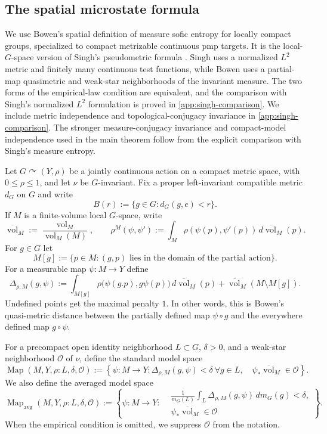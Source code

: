 \documentclass[12pt]{amsart}
\theoremstyle{definition}
\newcommand{\Haar}{m_G}
\newcommand{\vol}{\operatorname{vol}}
\newcommand{\Map}{\operatorname{Map}}
\newcommand{\Mapavg}{\operatorname{Map}_{\mathrm{avg}}}
\newcommand{\cO}{\mathcal O}
\newcommand{\1}{\mathbf 1}
\begin{document}
\subsection{The spatial microstate formula}

 We use Bowen's spatial definition of measure sofic entropy for locally compact
 groups, specialized to compact metrizable continuous pmp targets. It is the
 local-$G$-space version of Singh's pseudometric formula
 \cite[Section~3.4]{SinghThesis}. Singh uses a normalized $L^2$ metric and
 finitely many continuous test functions, while Bowen uses a partial-map
 quasimetric and weak-star neighborhoods of the invariant measure. The two
 forms of the empirical-law condition are equivalent, and the comparison with
 Singh's normalized $L^2$ formulation is proved in
 \cref{app:singh-comparison}.
	We include metric independence and topological-conjugacy invariance in
\cref{app:singh-comparison}. The stronger measure-conjugacy invariance and
compact-model independence used in the main theorem follow from the explicit
comparison with Singh's measure entropy.

Let $G\curvearrowright(Y,\rho)$ be a jointly continuous action on a compact metric space, with $0\leq\rho\leq1$, and let $\nu$ be $G$-invariant. Fix a proper left-invariant compatible metric $d_G$ on $G$ and write
\[
 B(r):=\{g\in G:d_G(g,e)<r\}.
\]
If $M$ is a finite-volume local $G$-space, write
\[
 \overline{\vol}_M:=\frac{\vol_M}{\vol_M(M)},
 \qquad
 \rho^M(\psi,\psi'):=\int_M\rho(\psi(p),\psi'(p))\,d\overline{\vol}_M(p).
\]
For $g\in G$ let
\[
 M[g]:=\{p\in M:(g,p)\text{ lies in the domain of the partial action}\}.
\]
For a measurable map $\psi:M\to Y$ define
\begin{equation}\label{eq:defect}
 \Delta_{\rho,M}(g,\psi)
 :=\int_{M[g]}\rho\bigl(\psi(g.p),g\psi(p)\bigr)\,d\overline{\vol}_M(p)
   +\overline{\vol}_M(M\setminus M[g]).
\end{equation}
Undefined points get the maximal penalty $1$. In other words, this is Bowen's quasi-metric distance between the partially defined map $\psi\circ g$ and the everywhere defined map $g\circ\psi$.

For a precompact open identity neighborhood $L\subset G$, $\delta>0$, and a weak-star neighborhood $\cO$ of $\nu$, define the standard model space
\[
 \Map(M,Y,\rho:L,\delta,\cO)
 :=\left\{\psi:M\to Y:
 \Delta_{\rho,M}(g,\psi)<\delta\ \forall g\in L,
 \quad \psi_*\overline{\vol}_M\in\cO\right\}.
\]
We also define the averaged model space
\[
 \Mapavg(M,Y,\rho:L,\delta,\cO)
 :=\left\{\psi:M\to Y:
 \begin{aligned}
 &\frac1{\Haar(L)}\int_L\Delta_{\rho,M}(g,\psi)\,d\Haar(g)<\delta,\\
 &\psi_*\overline{\vol}_M\in\cO
 \end{aligned}
 \right\}.
\]
When the empirical condition is omitted, we suppress $\cO$ from the notation.
\end{document}
